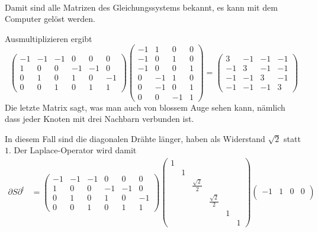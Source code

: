 \begin{loesung}
\begin{teilaufgaben}
\begin{align*}
\end{align*}
Damit sind alle Matrizen des Gleichungssystems bekannt, es kann mit
dem Computer gelöst werden.
\item Ausmultiplizieren ergibt
\[
\begin{pmatrix}
-1&-1&-1& 0& 0& 0\\
 1& 0& 0&-1&-1& 0\\
 0& 1& 0& 1& 0&-1\\
 0& 0& 1& 0& 1& 1
\end{pmatrix}
\begin{pmatrix}
  -1&  1&  0&  0\\
  -1&  0&  1&  0\\
  -1&  0&  0&  1\\
   0& -1&  1&  0\\
   0& -1&  0&  1\\
   0&  0& -1&  1
\end{pmatrix}
=\begin{pmatrix}
   3& -1& -1& -1\\
  -1&  3& -1& -1\\
  -1& -1&  3& -1\\
  -1& -1& -1&  3
\end{pmatrix}
\]
Die letzte Matrix sagt, was man auch von blossem Auge sehen kann,
nämlich dass jeder Knoten mit drei Nachbarn verbunden ist.
\item In diesem Fall sind die diagonalen Drähte länger, haben
als Widerstand $\sqrt{2}$ statt $1$. Der Laplace-Operator wird 
damit
\begin{align*}
\partial S\partial^t
&=
\begin{pmatrix}
-1&-1&-1& 0& 0& 0\\
 1& 0& 0&-1&-1& 0\\
 0& 1& 0& 1& 0&-1\\
 0& 0& 1& 0& 1& 1
\end{pmatrix}
\begin{pmatrix}
1& &                &                & & \\
 &1&                &                & & \\
 & &\frac{\sqrt{2}}2&                & & \\
 & &                &\frac{\sqrt{2}}2& & \\
 & &                &                &1& \\
 & &                &                & &1
\end{pmatrix}
\begin{pmatrix}
  -1&  1&  0&  0\\

\end{pmatrix}
\end{align*}
\end{teilaufgaben}
\end{loesung}
